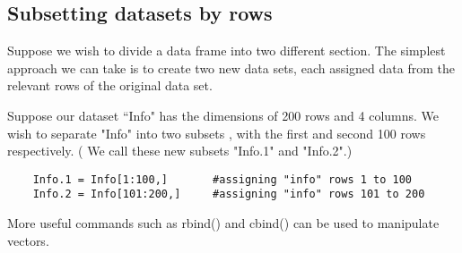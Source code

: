 \documentclass[a4paper,12pt]{article}
\begin{document}
	
	\newpage
	
	
	
	
	
	\subsection{Subsetting datasets by rows}
	
	Suppose we wish to divide a data frame into two different section. The simplest approach we can take is to create two new data sets, each assigned data from the relevant rows of the original data set.
	
	Suppose our dataset ``Info" has the dimensions of 200 rows and 4 columns. We wish to separate "Info" into two subsets , with the first and second 100 rows respectively. ( We call these new subsets "Info.1" and "Info.2".)
	\begin{verbatim}
	Info.1 = Info[1:100,]		#assigning "info" rows 1 to 100
	Info.2 = Info[101:200,]		#assigning "info" rows 101 to 200
	\end{verbatim}
	
	More useful commands such as rbind() and cbind()  can be used to manipulate vectors.
	
\end{document}
